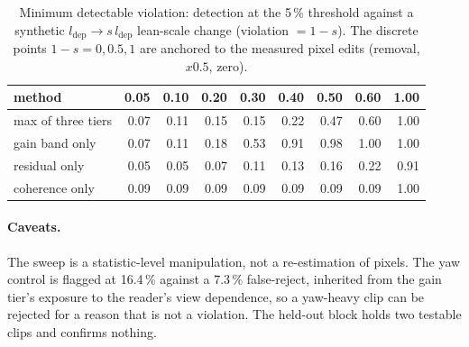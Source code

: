\begin{table}[t]
\centering
\caption{Minimum detectable violation: detection at the 5\,\% threshold against a synthetic
$l_{\mathrm{dep}} \to s\,l_{\mathrm{dep}}$ lean-scale change (violation $=1-s$). The discrete
points $1-s = 0, 0.5, 1$ are anchored to the measured pixel edits (removal, $x0.5$, zero).}
\label{tab:g02-mdv}
\begin{tabular}{lrrrrrrrr}
\toprule
method & 0.05 & 0.10 & 0.20 & 0.30 & 0.40 & 0.50 & 0.60 & 1.00 \\
\midrule
max of three tiers & 0.07 & 0.11 & 0.15 & 0.15 & 0.22 & 0.47 & 0.60 & 1.00 \\
gain band only     & 0.07 & 0.11 & 0.18 & 0.53 & 0.91 & 0.98 & 1.00 & 1.00 \\
residual only      & 0.05 & 0.05 & 0.07 & 0.11 & 0.13 & 0.16 & 0.22 & 0.91 \\
coherence only     & 0.09 & 0.09 & 0.09 & 0.09 & 0.09 & 0.09 & 0.09 & 1.00 \\
\bottomrule
\end{tabular}
\end{table}

\paragraph{Caveats.} The sweep is a statistic-level manipulation, not a re-estimation of pixels.
The yaw control is flagged at 16.4\,\% against a 7.3\,\% false-reject, inherited from the gain
tier's exposure to the reader's view dependence, so a yaw-heavy clip can be rejected for a
reason that is not a violation. The held-out block holds two testable clips and confirms nothing.
